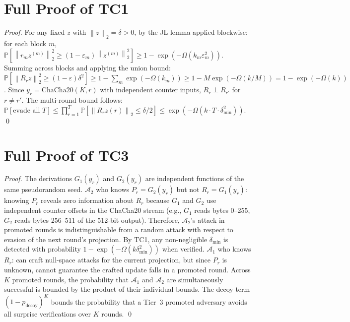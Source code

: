 \documentclass{article}
\renewcommand{\Pr}{\mathbb{P}}
\newcommand{\norm}[1]{\left\lVert #1 \right\rVert}
\begin{document}
\section{Full Proof of TC1}
\label{app:tc1}

\begin{proof}
For any fixed $z$ with $\norm{z}_2 = \delta > 0$, by the JL lemma applied
blockwise: for each block $m$,
$\Pr[\norm{r_m z^{(m)}}_2^2 \geq (1-\varepsilon_m)\norm{z^{(m)}}_2^2]
\geq 1 - \exp(-\Omega(k_m \varepsilon_m^2))$.
Summing across blocks and applying the union bound:
$\Pr[\norm{R_r z}_2^2 \geq (1-\varepsilon)\delta^2]
\geq 1 - \sum_m \exp(-\Omega(k_m))
\geq 1 - M \exp(-\Omega(k/M))
= 1 - \exp(-\Omega(k))$.
Since $y_r = \mathrm{ChaCha20}(K, r)$ with independent counter inputs,
$R_r \perp R_{r'}$ for $r \neq r'$.
The multi-round bound follows: $\Pr[\text{evade all } T] \leq
\prod_{r=1}^T \Pr[\norm{R_r z(r)}_2 \leq \delta/2]
\leq \exp(-\Omega(k \cdot T \cdot \delta_{\min}^2))$. \qed
\end{proof}

\section{Full Proof of TC3}
\label{app:tc3}

\begin{proof}
The derivations $G_1(y_r)$ and $G_2(y_r)$ are independent functions of the
same pseudorandom seed.
$\mathcal{A}_2$ who knows $P_r = G_2(y_r)$ but not $R_r = G_1(y_r)$:
knowing $P_r$ reveals zero information about $R_r$ because $G_1$ and $G_2$
use independent counter offsets in the ChaCha20 stream
(e.g., $G_1$ reads bytes 0--255, $G_2$ reads bytes 256--511 of the 512-bit
output).
Therefore, $\mathcal{A}_2$'s attack in promoted rounds is indistinguishable
from a random attack with respect to evasion of the next round's projection.
By TC1, any non-negligible $\delta_{\min}$ is detected with probability
$1 - \exp(-\Omega(k\delta_{\min}^2))$ when verified.
$\mathcal{A}_1$ who knows $R_r$: can craft null-space attacks for the current
projection, but since $P_r$ is unknown, cannot guarantee the crafted update
falls in a promoted round.
Across $K$ promoted rounds, the probability that $\mathcal{A}_1$ and
$\mathcal{A}_2$ are simultaneously successful is bounded by the product of
their individual bounds.
The decoy term $(1-p_{\mathrm{decoy}})^K$ bounds the probability that
a Tier~3 promoted adversary avoids all surprise verifications over $K$ rounds.
\qed
\end{proof}
\end{document}
